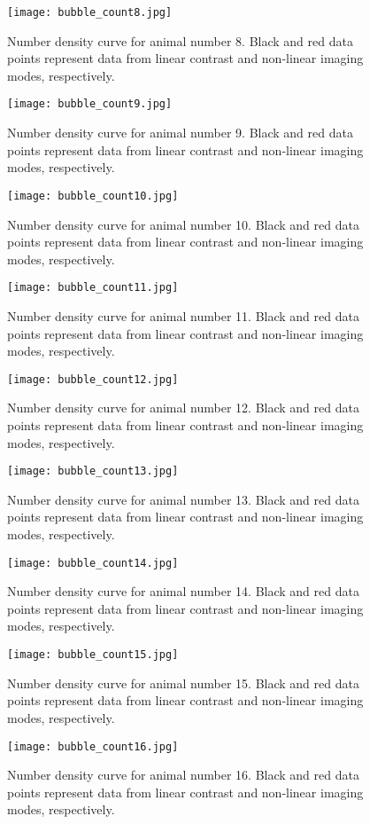 \begin{figure}
\texttt{[image: bubble\_count8.jpg]}
\caption{Number density curve for animal number 8. Black and red data points represent data from linear contrast and non-linear imaging modes, respectively.}
\end{figure}\begin{figure}
\texttt{[image: bubble\_count9.jpg]}
\caption{Number density curve for animal number 9. Black and red data points represent data from linear contrast and non-linear imaging modes, respectively.}
\end{figure}
\begin{figure}
\texttt{[image: bubble\_count10.jpg]}
\caption{Number density curve for animal number 10. Black and red data points represent data from linear contrast and non-linear imaging modes, respectively.}
\end{figure}
\begin{figure}
\texttt{[image: bubble\_count11.jpg]}
\caption{Number density curve for animal number 11. Black and red data points represent data from linear contrast and non-linear imaging modes, respectively.}
\end{figure}
\begin{figure}
\texttt{[image: bubble\_count12.jpg]}
\caption{Number density curve for animal number 12. Black and red data points represent data from linear contrast and non-linear imaging modes, respectively.}
\end{figure}\begin{figure}
\texttt{[image: bubble\_count13.jpg]}
\caption{Number density curve for animal number 13. Black and red data points represent data from linear contrast and non-linear imaging modes, respectively.}
\end{figure}
\begin{figure}
\texttt{[image: bubble\_count14.jpg]}
\caption{Number density curve for animal number 14. Black and red data points represent data from linear contrast and non-linear imaging modes, respectively.}
\end{figure}
\begin{figure}
\texttt{[image: bubble\_count15.jpg]}
\caption{Number density curve for animal number 15. Black and red data points represent data from linear contrast and non-linear imaging modes, respectively.}
\end{figure}
\begin{figure}
	\texttt{[image: bubble\_count16.jpg]}
	\caption{Number density curve for animal number 16. Black and red data points represent data from linear contrast and non-linear imaging modes, respectively.}
\end{figure}
\clearpage